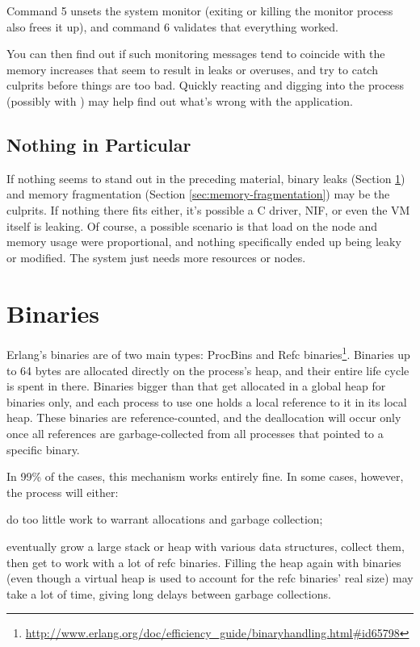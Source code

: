 \documentclass[11pt, oneside]{book}   	%
\begin{document}
Command 5 unsets the system monitor (exiting or killing the monitor process also frees it up), and command 6 validates that everything worked.

You can then find out if such monitoring messages tend to coincide with the memory increases that seem to result in leaks or overuses, and try to catch culprits before things are too bad. Quickly reacting and digging into the process (possibly with ) may help find out what's wrong with the application.

\subsection{Nothing in Particular}

If nothing seems to stand out in the preceding material, binary leaks (Section \ref{sec:binaries}) and memory fragmentation (Section \ref{sec:memory-fragmentation}) may be the culprits. If nothing there fits either, it's possible a C driver, NIF, or even the VM itself is leaking. Of course, a possible scenario is that load on the node and memory usage were proportional, and nothing specifically ended up being leaky or modified. The system just needs more resources or nodes.

\section{Binaries}
\label{sec:binaries}

Erlang's binaries are of two main types: ProcBins and Refc binaries\footnote{\href{http://www.erlang.org/doc/efficiency\_guide/binaryhandling.html\#id65798}{http://www.erlang.org/doc/efficiency\_guide/binaryhandling.html\#id65798}}. Binaries up to 64 bytes are allocated directly on the process's heap, and their entire life cycle is spent in there. Binaries bigger than that get allocated in a global heap for binaries only, and each process to use one holds a local reference to it in its local heap. These binaries are reference-counted, and the deallocation will occur only once all references are garbage-collected from all processes that pointed to a specific binary.

In 99\% of the cases, this mechanism works entirely fine. In some cases, however, the process will either:

\begin{enumerate*}
	\item do too little work to warrant allocations and garbage collection;
         \item eventually grow a large stack or heap with various data structures, collect them, then get to work with a lot of refc binaries. Filling the heap again with binaries (even though a virtual heap is used to account for the refc binaries' real size) may take a lot of time, giving long delays between garbage collections.
\end{enumerate*}
\end{document}
